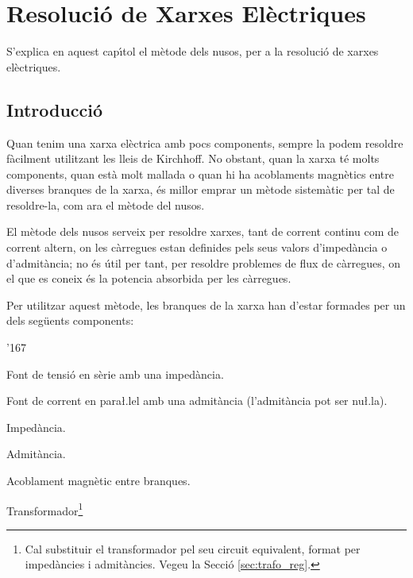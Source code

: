 \chapter{Resoluci\'{o} de Xarxes El\`{e}ctriques} \label{chap:nusos}

S'explica en aquest cap\'{\i}tol el
m\`{e}tode dels nusos, per a la resoluci\'{o} de xarxes el\`{e}ctriques.

\section{Introducci\'{o}}

Quan tenim una xarxa el\`{e}ctrica amb pocs components, sempre la podem resoldre f\`{a}cilment
utilitzant les lleis de Kirchhoff. No obstant, quan la xarxa t\'{e} molts components, quan est\`{a}
 molt mallada o quan hi ha acoblaments magn\`{e}tics entre diverses branques de la xarxa, \'{e}s millor
 emprar un m\`{e}tode sistem\`{a}tic per tal de resoldre-la, com ara el m\`{e}tode del nusos.

El m\`{e}tode dels nusos serveix per resoldre xarxes, tant de corrent
continu com de corrent altern, on les c\`{a}rregues estan definides pels
seus valors d'imped\`{a}ncia o d'admit\`{a}ncia; no \'{e}s \'{u}til per tant, per
resoldre problemes de flux de c\`{a}rregues, on el que es coneix \'{e}s la
potencia absorbida per les c\`{a}rregues.

Per utilitzar aquest m\`{e}tode, les branques de la xarxa han d'estar
formades per un dels seg\"{u}ents components: \vspace{-1.5mm}
\begin{dinglist}{'167}
   \item Font de tensi\'{o} en s\`{e}rie amb una imped\`{a}ncia.
   \item Font de corrent en para{\l.l}el amb una admit\`{a}ncia (l'admit\`{a}ncia pot ser nu{\l.l}a).
   \item Imped\`{a}ncia.
   \item Admit\`{a}ncia.
   \item Acoblament magn\`{e}tic entre branques.
   \item Transformador\footnote{Cal substituir el transformador pel seu circuit equivalent, format per imped\`{a}ncies i
   admit\`{a}ncies. Vegeu la Secci\'{o} \ref{sec:trafo_reg}.}
\end{dinglist}
\vspace{-1.5mm}

